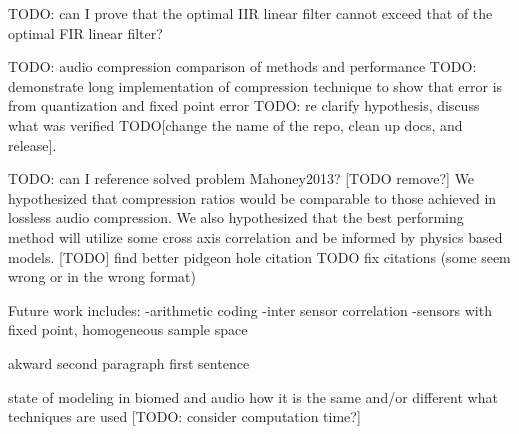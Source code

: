 \documentclass[journal]{IEEEtran}
\begin{document}
TODO: can I prove that the optimal IIR linear filter cannot exceed that of the optimal FIR linear filter?

TODO: audio compression comparison of methods and performance
TODO: demonstrate long implementation of compression technique to show that error is from quantization and fixed point error
TODO: re clarify hypothesis, discuss what was verified
TODO[change the name of the repo, clean up docs, and release]. 

TODO: can I reference solved problem Mahoney2013?
[TODO remove?]  We hypothesized that compression ratios would be comparable to those achieved in lossless audio compression. We also hypothesized that the best performing method will utilize some cross axis correlation and be informed by physics based models.
[TODO] find better pidgeon hole citation
TODO fix citations (some seem wrong or in the wrong format)

Future work includes:
-arithmetic coding
-inter sensor correlation
-sensors with fixed point, homogeneous sample space

akward second paragraph first sentence

state of modeling in biomed and audio
how it is the same and/or different
what techniques are used
[TODO: consider computation time?]
\end{document}
